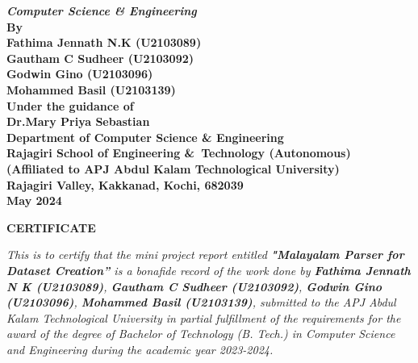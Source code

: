 \documentclass[12pt,a4paper,titlepage]{report}
\begin{document}
\begin{center}
		{\Large \bf \itshape{{Computer\; Science\; \&\; Engineering}}}\\[0.4cm]
		\large \bfseries{By}\\[.4cm]
		\large \bfseries{ Fathima Jennath N.K (U2103089) }\\[0.2cm]
		\large \bfseries{ Gautham C Sudheer (U2103092) }\\[0.2cm]
		\large \bfseries{ Godwin Gino (U2103096) }\\[0.2cm]
		\large \bfseries{ Mohammed Basil (U2103139) }\\[0.6cm]
		\large \bfseries{Under the guidance of}\\[0.75cm]
		\large \bfseries{Dr.Mary Priya Sebastian}\\[0.75cm]
		\large \textbf{Department of Computer\; Science\; \&\; Engineering}\\
		\large \textbf{Rajagiri School of Engineering \&\ Technology (Autonomous)}\\
		\small \bfseries{(Affiliated to APJ Abdul Kalam Technological University)}\\
		\large \textbf{Rajagiri Valley, Kakkanad, Kochi, 682039}\\
		\large \bfseries{May 2024}
	\end{center}
	
	\newpage
	\thispagestyle{empty}
	\begin{center}
		
		\large \bfseries{\huge{CERTIFICATE}}\\[5cm]
	\end{center}
	
	\renewcommand{\baselinestretch}{1.2}\normalsize
	
	\emph{This is to certify that the mini project report entitled \textbf{"Malayalam Parser for Dataset Creation”} is a bonafide record of the work done by \textbf{Fathima Jennath N K (U2103089)}, \textbf{Gautham C Sudheer (U2103092)}, \textbf{Godwin Gino (U2103096)}, \textbf{Mohammed Basil (U2103139)}, submitted to the APJ Abdul Kalam Technological University in partial fulfillment of the requirements for the award of the degree of Bachelor of Technology (B. Tech.) in Computer Science and Engineering during the academic year 2023-2024.}\\[2.5cm]
	
\end{document}
